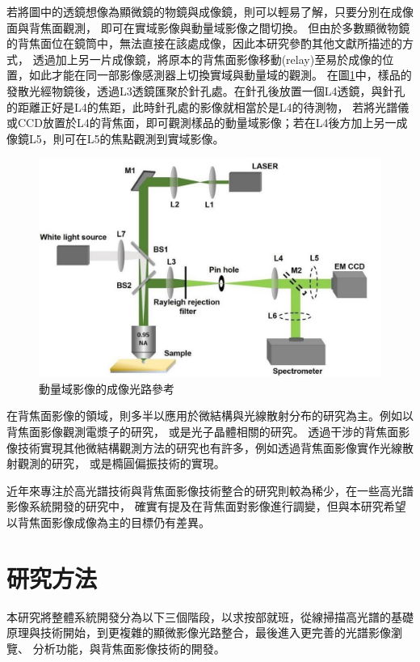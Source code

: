 \documentclass[12pt]{article}
\begin{document}
若將圖中的透鏡想像為顯微鏡的物鏡與成像鏡，則可以輕易了解，只要分別在成像面與背焦面觀測，
即可在實域影像與動量域影像之間切換。
但由於多數顯微物鏡的背焦面位在鏡筒中，無法直接在該處成像，因此本研究參酌其他文獻\cite{bfpimage}所描述的方式，
透過加上另一片成像鏡，將原本的背焦面影像移動(relay)至易於成像的位置，如此才能在同一部影像感測器上切換實域與動量域的觀測。
在圖\ref{path}中，樣品的發散光經物鏡後，透過L3透鏡匯聚於針孔處。在針孔後放置一個L4透鏡，與針孔的距離正好是L4的焦距，此時針孔處的影像就相當於是L4的待測物，
若將光譜儀或CCD放置於L4的背焦面，即可觀測樣品的動量域影像；若在L4後方加上另一成像鏡L5，則可在L5的焦點觀測到實域影像。
\begin{figure}[h]
    \centering
    \includegraphics[width=\linewidth]{bfppath.jpg}
    \caption{動量域影像的成像光路參考\cite{bfpimage}}
    \label{path}
\end{figure}

在背焦面影像的領域，則多半以應用於微結構與光線散射分布的研究為主。例如以背焦面影像觀測電漿子的研究，
或是光子晶體相關的研究\cite{hartmann2013radiation,zhang2014back,wagner2012back}。
透過干涉的背焦面影像技術實現其他微結構觀測方法的研究也有許多，例如透過背焦面影像實作光線散射觀測的研究\cite{davidson2006interferometric}，
或是橢圓偏振技術的實現\cite{feke1998interferometric}。

近年來專注於高光譜技術與背焦面影像技術整合的研究則較為稀少，在一些高光譜影像系統開發的研究中，
確實有提及在背焦面對影像進行調變\cite{gao2010snapshot}，但與本研究希望以背焦面影像成像為主的目標仍有差異。
\section{研究方法}
本研究將整體系統開發分為以下三個階段，以求按部就班，從線掃描高光譜的基礎原理與技術開始，到更複雜的顯微影像光路整合，最後進入更完善的光譜影像瀏覽、
分析功能，與背焦面影像技術的開發。
\end{document}
